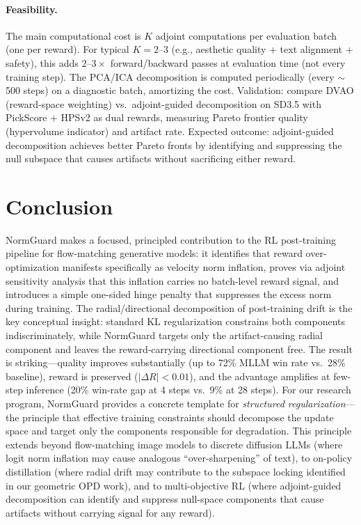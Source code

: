 \documentclass[11pt,a4paper]{article}
\begin{document}
\paragraph{Feasibility.} The main computational cost is $K$ adjoint computations per evaluation batch (one per reward). For typical $K=2$--$3$ (e.g., aesthetic quality + text alignment + safety), this adds $2$--$3\times$ forward/backward passes at evaluation time (not every training step). The PCA/ICA decomposition is computed periodically (every $\sim$500 steps) on a diagnostic batch, amortizing the cost. Validation: compare DVAO (reward-space weighting) vs.\ adjoint-guided decomposition on SD3.5 with PickScore + HPSv2 as dual rewards, measuring Pareto frontier quality (hypervolume indicator) and artifact rate. Expected outcome: adjoint-guided decomposition achieves better Pareto fronts by identifying and suppressing the null subspace that causes artifacts without sacrificing either reward.

\section{Conclusion}

NormGuard makes a focused, principled contribution to the RL post-training pipeline for flow-matching generative models: it identifies that reward over-optimization manifests specifically as velocity norm inflation, proves via adjoint sensitivity analysis that this inflation carries no batch-level reward signal, and introduces a simple one-sided hinge penalty that suppresses the excess norm during training. The radial/directional decomposition of post-training drift is the key conceptual insight: standard KL regularization constrains both components indiscriminately, while NormGuard targets only the artifact-causing radial component and leaves the reward-carrying directional component free. The result is striking---quality improves substantially (up to 72\% MLLM win rate vs.\ 28\% baseline), reward is preserved ($|\Delta R| < 0.01$), and the advantage amplifies at few-step inference (20\% win-rate gap at 4 steps vs.\ 9\% at 28 steps). For our research program, NormGuard provides a concrete template for \emph{structured regularization}---the principle that effective training constraints should decompose the update space and target only the components responsible for degradation. This principle extends beyond flow-matching image models to discrete diffusion LLMs (where logit norm inflation may cause analogous ``over-sharpening'' of text), to on-policy distillation (where radial drift may contribute to the subspace locking identified in our geometric OPD work), and to multi-objective RL (where adjoint-guided decomposition can identify and suppress null-space components that cause artifacts without carrying signal for any reward).
\end{document}
